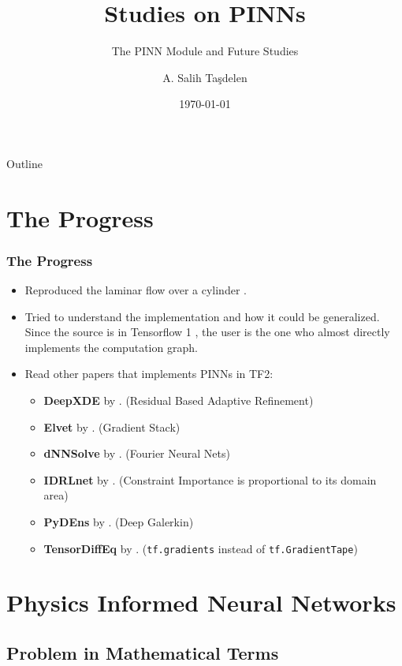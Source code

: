 \documentclass{beamer}
\title{Studies on PINNs}
\subtitle{The PINN Module and Future Studies}
\author{A. Salih Taşdelen}
\institute{METU}
\date{\today}
\begin{document}
\titlepage

\begin{frame}{Outline}
    \tableofcontents
\end{frame}

\section{The Progress}

\begin{frame}
\frametitle{The Progress}
\begin{itemize}
    \item Reproduced the laminar flow over a cylinder \cite{rao_physics-informed_2020}.
    \item Tried to understand the implementation and how it could be generalized. Since the source is in Tensorflow 1 \parencite{abadi_tensorflow_2016}, the user is the one who almost directly implements the computation graph.
    \item Read other papers that implements PINNs in TF2:
    \begin{itemize}
        \item \textbf{DeepXDE} by \cite{lu_deepxde_2021}. (Residual Based Adaptive Refinement)
        \item \textbf{Elvet} by \cite{araz_elvet_2021}. (Gradient Stack)
        \item \textbf{dNNSolve} by \cite{guidetti_dnnsolve_2021}. (Fourier Neural Nets)
        \item \textbf{IDRLnet} by \cite{peng_idrlnet_2021}. (Constraint Importance is proportional to its domain area)
        \item \textbf{PyDEns} by \cite{koryagin_pydens_2019}. (Deep Galerkin)
        \item \textbf{TensorDiffEq} by \cite{mcclenny_tensordiffeq_2021}. (\texttt{tf.gradients} instead of \texttt{tf.GradientTape})
    \end{itemize}
    
\end{itemize}    
\end{frame}

\section{Physics Informed Neural Networks}

\subsection{Problem in Mathematical Terms}
\end{document}
